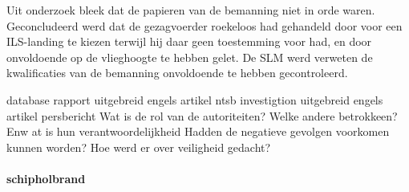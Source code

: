 Uit onderzoek bleek dat de papieren van de bemanning niet in orde waren. 
Geconcludeerd werd dat de gezagvoerder roekeloos had gehandeld door voor een ILS-landing te kiezen terwijl hij daar geen toestemming voor had, en door onvoldoende op de vlieghoogte te hebben gelet. 
De SLM werd verweten de kwalificaties van de bemanning onvoldoende te hebben gecontroleerd.

 

\cite{espnSLMterugblik}
\cite{dennisRosier01052020}
\cite{hassing07062020slmramp}
\cite{amsterdamArchiefSLM}
\cite{rtvOost06062019nabestaande}
\cite{breda07062021AndroSnel}
\cite{andereTijdenSLMCrash}
database
\cite{aviationReport}
rapport
\cite{aviationSLMCrashAccidentInvestigation}
\cite{mcDonnelDouglasCommissionReportSLMCrash}
\cite{wikiSRFlight764}
\cite{nos07062019SLMTerugblik}
\cite{dagvantoenSLMCrash}
\cite{waterkantNesty07061989}
uitgebreid engels artikel
\cite{eduNandlalSRCrash}
ntsb investigtion
\cite{oldjetsSRAirways}
uitgebreid engels artikel
\cite{cloudberg02012021srflight764}
persbericht
\cite{apnews07061989srplanecrash}
Wat is de rol van de autoriteiten?
Welke andere betrokkeen? Enw at is hun verantwoordelijkheid
Hadden de negatieve gevolgen voorkomen kunnen worden?
Hoe werd er over veiligheid gedacht?



\paragraph{schipholbrand}

